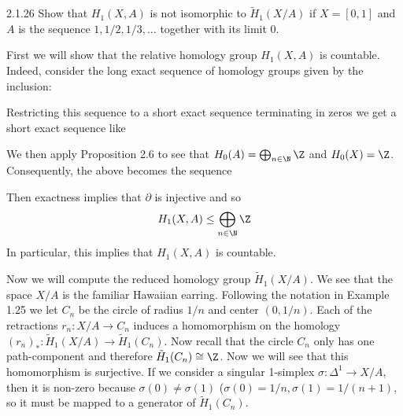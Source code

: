 \documentclass{article}
\begin{document}
\begin{exercise}{2.1.26}{\parindent}
  Show that $H_1(X,A)$ is not isomorphic to $\tilde{H}_1(X/A)$ if $X =
  [0,1]$ and $A$ is the sequence $1,1/2,1/3,\ldots$ together with its
  limit 0.
\end{exercise}
\begin{solution}{\parindent}
  First we will show that the relative homology group $H_1(X,A)$ is
  countable. Indeed, consider the long exact sequence of homology
  groups given by the inclusion:
  \begin{center}
  \end{center}
  Restricting this sequence to a short exact sequence terminating in
  zeros we get a short exact sequence like
  \begin{center}
  \end{center}
  We then apply Proposition 2.6 to see that $H_0(A) = \bigoplus_{n\in
    \N} \Z$ and $H_0(X) = \Z$. Consequently, the above becomes the
  sequence
  \begin{center}
  \end{center}
  Then exactness implies that $\partial$ is injective and so 
  \[
  H_1(X,A) \leq \bigoplus_{n \in \N} \Z
  \]
  In particular, this implies that $H_1(X,A)$ is countable.

  Now we will compute the reduced homology group
  $\tilde{H}_1(X/A)$. We see that the space $X/A$ is the familiar
  Hawaiian earring. Following the notation in Example 1.25 we let
  $C_n$ be the circle of radius $1/n$ and center $(0,1/n)$. Each of
  the retractions $r_n: X/A \to C_n$ induces a homomorphism on the
  homology $(r_n)_\ast: \tilde{H}_1(X/A) \to \tilde{H}_1(C_n)$. Now
  recall that the circle $C_n$ only has one path-component and
  therefore $\tilde{H}_1(C_n) \cong \Z$. Now we will see that this
  homomorphism is surjective. If we consider a singular 1-simplex
  $\sigma: \Delta^1 \to X/A$, then it is non-zero because $\sigma(0)
  \neq \sigma(1)$ ($\sigma(0) = 1/n, \sigma(1) = 1/(n+1)$, so it must
  be mapped to a generator of $\tilde{H}_1(C_n)$.


\end{solution}
\end{document}
